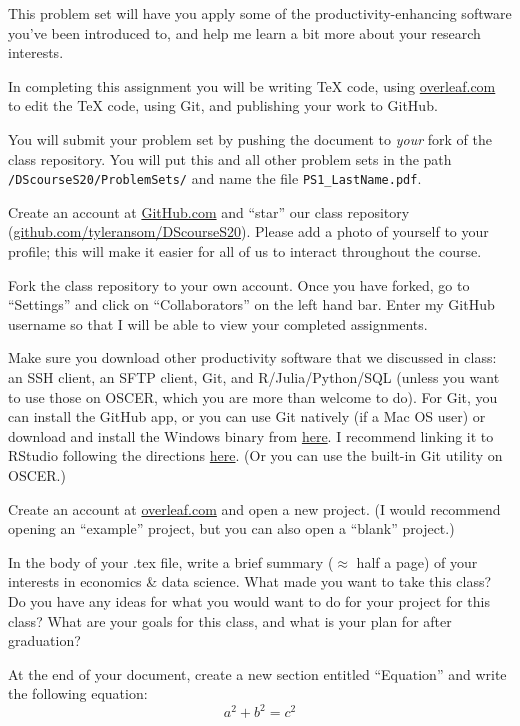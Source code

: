 \documentclass[12pt,english]{exam}
\begin{document}
This problem set will have you apply some of the productivity-enhancing software you've been introduced to, and help me learn a bit more about your research interests.

In completing this assignment you will be writing TeX code, using \url{overleaf.com} to edit the TeX code, using Git, and publishing your work to GitHub.

You will submit your problem set by pushing the document to \emph{your} fork of the class repository. You will put this and all other problem sets in the path \texttt{/DScourseS20/ProblemSets/} and name the file \texttt{PS1\_LastName.pdf}.

\begin{questions}
\question Create an account at \url{GitHub.com} and ``star'' our class repository (\url{github.com/tyleransom/DScourseS20}). Please add a photo of yourself to your profile; this will make it easier for all of us to interact throughout the course.

\question Fork the class repository to your own account. Once you have forked, go to ``Settings'' and click on ``Collaborators'' on the left hand bar. Enter my GitHub username so that I will be able to view your completed assignments.

\question Make sure you download other productivity software that we discussed in class: an SSH client, an SFTP client, Git, and R/Julia/Python/SQL (unless you want to use those on OSCER, which you are more than welcome to do). For Git, you can install the GitHub app, or you can use Git natively (if a Mac OS user) or download and install the Windows binary from \href{https://git-scm.com/download/win}{here}. I recommend linking it to RStudio following the directions \href{https://raw.githack.com/uo-ec607/lectures/master/02-git/02-Git.html#13}{here}. (Or you can use the built-in Git utility on OSCER.)

\question Create an account at \url{overleaf.com} and open a new project. (I would recommend opening an ``example'' project, but you can also open a ``blank'' project.)

\question In the body of your .tex file, write a brief summary ($\approx$ half a page) of your interests in economics \& data science. What made you want to take this class? Do you have any ideas for what you would want to do for your project for this class? What are your goals for this class, and what is your plan for after graduation?

\question At the end of your document, create a new section entitled ``Equation'' and write the following equation:
\begin{equation}
	a^{2} + b^{2} = c^{2}
\end{equation}


\end{questions}
\end{document}
